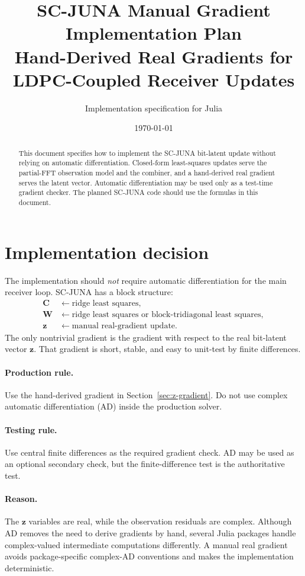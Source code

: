 \documentclass[11pt]{article}
\title{SC-JUNA Manual Gradient Implementation Plan\\
\large Hand-Derived Real Gradients for LDPC-Coupled Receiver Updates}
\author{Implementation specification for Julia}
\date{\today}
\begin{document}
\maketitle

\begin{abstract}
This document specifies how to implement the SC-JUNA bit-latent update without relying on automatic differentiation.  Closed-form least-squares updates serve the partial-FFT observation model and the combiner, and a hand-derived real gradient serves the latent vector.  Automatic differentiation may be used only as a test-time gradient checker.  The planned SC-JUNA code should use the formulas in this document.
\end{abstract}

\tableofcontents
\clearpage

\section{Implementation decision}

The implementation should \emph{not} require automatic differentiation for the main receiver loop.  SC-JUNA has a block structure:
\begin{align}
\mathbf C &\leftarrow \text{ridge least squares},\\
\mathbf W &\leftarrow \text{ridge least squares or block-tridiagonal least squares},\\
\bm z &\leftarrow \text{manual real-gradient update}.
\end{align}
The only nontrivial gradient is the gradient with respect to the real bit-latent vector $\bm z$.  That gradient is short, stable, and easy to unit-test by finite differences.

\paragraph{Production rule.}
Use the hand-derived gradient in Section~\ref{sec:z-gradient}.  Do not use complex automatic differentiation (AD) inside the production solver.

\paragraph{Testing rule.}
Use central finite differences as the required gradient check.  AD may be used as an optional secondary check, but the finite-difference test is the authoritative test.

\paragraph{Reason.}
The $\bm z$ variables are real, while the observation residuals are complex.  Although AD removes the need to derive gradients by hand, several Julia packages handle complex-valued intermediate computations differently.  A manual real gradient avoids package-specific complex-AD conventions and makes the implementation deterministic.
\end{document}
